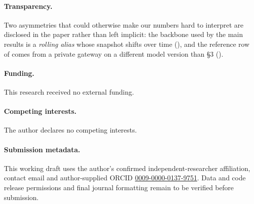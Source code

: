 \documentclass[11pt,twoside,twocolumn,letterpaper]{article}
\begin{document}
\paragraph{Transparency.} Two asymmetries that could otherwise make our numbers hard to interpret are disclosed in the paper rather than left implicit: the backbone used by the main results is a \emph{rolling alias} whose snapshot shifts over time (), and the reference row of  comes from a private gateway on a different model version than \S3 ().

\paragraph{Funding.} This research received no external funding.

\paragraph{Competing interests.} The author declares no competing interests.

\paragraph{Submission metadata.} This working draft uses the author's confirmed independent-researcher affiliation, contact email and author-supplied ORCID \href{https://orcid.org/0009-0000-0137-9751}{0009-0000-0137-9751}. Data and code release permissions and final journal formatting remain to be verified before submission.



\end{document}
